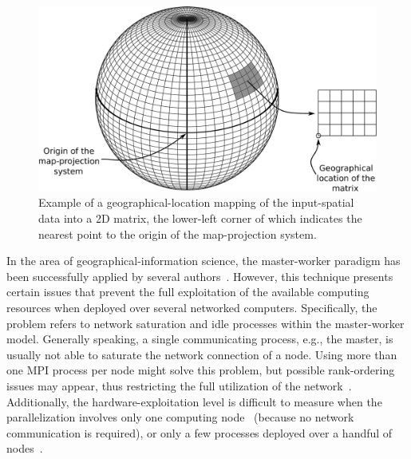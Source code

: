 \begin{figure}
\centering

\includegraphics[width=1\textwidth]{04-framework_design_and_implementation/img/spatial_data_projection}

\caption{Example of a geographical-location mapping of the input-spatial data
into a 2D matrix, the lower-left corner of which indicates the nearest
point to the origin of the map-projection system.\label{fig:04-Spatial_data_location_mapping}}
\end{figure}


In the area of geographical-information science, the master-worker
paradigm has been successfully applied by several authors~\cite{Akhter-GRASS_GIS_on_high_performance_computing_with_MPI_OpenMP_and_Ninf-G:2010,Campos_Parallel_modelling_in_GIS:2012,Guan_A_parallel_computing_approach_to_fast_geostatistical_areal_interpolation:2011,Huang-Explorations_of_the_implementation_of_a_parallel_IDW_algorithm_in_a_Linux_cluster:2011,Tabik-High_performance_three_horizon_composition_algorithm_for_large_scale_terrains:2011,Tabik-Optimal_tilt_and_orientation_maps_a_multi_algorithm_approach_for_heterogeneous_multicore_GPU_systems:2013}.
However, this technique presents certain issues that prevent the full
exploitation of the available computing resources when deployed over
several networked computers. Specifically, the problem refers to network
saturation and idle processes within the master-worker model. Generally
speaking, a single communicating process, e.g., the master, is usually
not able to saturate the network connection of a node. Using more
than one MPI process per node might solve this problem, but possible
rank-ordering issues may appear, thus restricting the full utilization
of the network~\cite{Rabenseifner-Hybrid_MPI_OpenMP_parallel_programming_on_clusters_of_multicore_nodes:2009}.
Additionally, the hardware-exploitation level is difficult to measure
when the parallelization involves only one computing node~\cite{Tabik-High_performance_three_horizon_composition_algorithm_for_large_scale_terrains:2011,Tabik-Optimal_tilt_and_orientation_maps_a_multi_algorithm_approach_for_heterogeneous_multicore_GPU_systems:2013}
(because no network communication is required), or only a few processes
deployed over a handful of nodes~\cite{Huang-Explorations_of_the_implementation_of_a_parallel_IDW_algorithm_in_a_Linux_cluster:2011}. 

